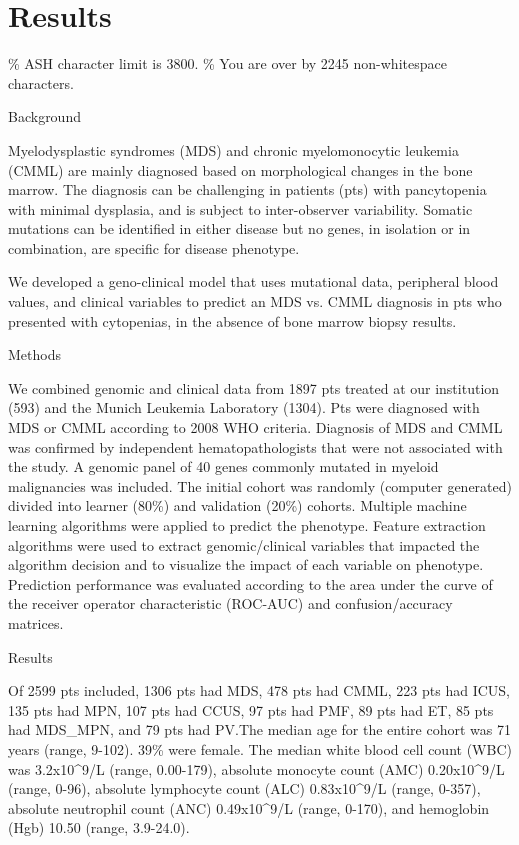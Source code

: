 \section{Results}%
\% ASH character limit is 3800. 
\% You are over by 2245 non-whitespace characters.


Background

Myelodysplastic syndromes (MDS) and chronic myelomonocytic leukemia (CMML) are mainly diagnosed based on morphological changes in the bone marrow. The diagnosis can be challenging in patients (pts) with pancytopenia with minimal dysplasia, and is subject to inter-observer variability. Somatic mutations can be identified in either disease but no genes, in isolation or in combination, are specific for disease phenotype.

We developed a geno-clinical model that uses mutational data, peripheral blood values, and clinical variables to predict an MDS vs. CMML diagnosis in pts who presented with cytopenias, in the absence of bone marrow biopsy results.


Methods

We combined genomic and clinical data from 1897 pts treated at our institution (593) and the Munich Leukemia Laboratory (1304). Pts were diagnosed with MDS or CMML according to 2008 WHO criteria. Diagnosis of MDS and CMML was confirmed by independent hematopathologists that were not associated with the study. A genomic panel of 40 genes commonly mutated in myeloid malignancies was included. The initial cohort was randomly (computer generated) divided into learner (80\%) and validation (20\%) cohorts. Multiple machine learning algorithms were applied to predict the phenotype. Feature extraction algorithms were used to extract genomic/clinical variables that impacted the algorithm decision and to visualize the impact of each variable on phenotype. Prediction performance was evaluated according to the area under the curve of the receiver operator characteristic (ROC-AUC) and confusion/accuracy matrices.


Results

Of 2599 pts included, 1306 pts had MDS, 478 pts had CMML, 223 pts had ICUS, 135 pts had MPN, 107 pts had CCUS, 97 pts had PMF, 89 pts had ET, 85 pts had MDS_MPN, and 79 pts had PV.The median age for the entire cohort was 71 years (range, 9-102). 39\% were female. The median white blood cell count (WBC) was 3.2x10^9/L (range, 0.00-179), absolute monocyte count (AMC) 0.20x10^9/L (range, 0-96), absolute lymphocyte count (ALC) 0.83x10^9/L (range, 0-357), absolute neutrophil count (ANC) 0.49x10^9/L (range, 0-170), and hemoglobin (Hgb)  10.50 (range, 3.9-24.0). 

